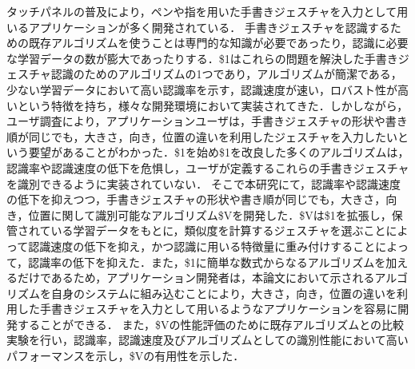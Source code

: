 タッチパネルの普及により，ペンや指を用いた手書きジェスチャを入力として用いるアプリケーションが多く開発されている．
手書きジェスチャを認識するための既存アルゴリズムを使うことは専門的な知識が必要であったり，認識に必要な学習データの数が膨大であったりする．\$1はこれらの問題を解決した手書きジェスチャ認識のためのアルゴリズムの1つであり，アルゴリズムが簡潔である，少ない学習データにおいて高い認識率を示す，認識速度が速い，ロバスト性が高いという特徴を持ち，様々な開発環境において実装されてきた．しかしながら，ユーザ調査により，アプリケーションユーザは，手書きジェスチャの形状や書き順が同じでも，大きさ，向き，位置の違いを利用したジェスチャを入力したいという要望があることがわかった．\$1を始め\$1を改良した多くのアルゴリズムは，認識率や認識速度の低下を危惧し，ユーザが定義するこれらの手書きジェスチャを識別できるように実装されていない．
そこで本研究にて，認識率や認識速度の低下を抑えつつ，手書きジェスチャの形状や書き順が同じでも，大きさ，向き，位置に関して識別可能なアルゴリズム\$Vを開発した．\$Vは\$1を拡張し，保管されている学習データをもとに，類似度を計算するジェスチャを選ぶことによって認識速度の低下を抑え，かつ認識に用いる特徴量に重み付けすることによって，認識率の低下を抑えた．また，\$1に簡単な数式からなるアルゴリズムを加えるだけであるため，アプリケーション開発者は，本論文において示されるアルゴリズムを自身のシステムに組み込むことにより，大きさ，向き，位置の違いを利用した手書きジェスチャを入力として用いるようなアプリケーションを容易に開発することができる．
また，\$Vの性能評価のために既存アルゴリズムとの比較実験を行い，認識率，認識速度及びアルゴリズムとしての識別性能において高いパフォーマンスを示し，\$Vの有用性を示した．